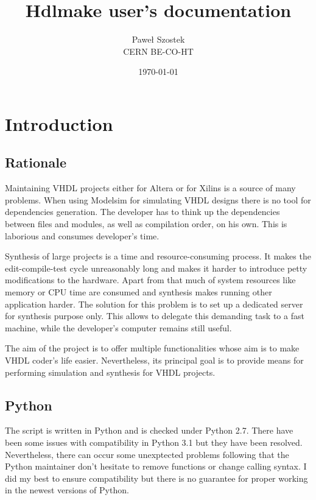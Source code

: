 \documentclass[a4paper,11pt]{article}
\title{Hdlmake user's documentation}
\author{Paweł Szostek \\ CERN BE-CO-HT}
\date{\today}
\begin{document}
\maketitle
\section*{Introduction}
\subsection*{Rationale}
Maintaining VHDL projects either for Altera or for Xilins is a source of many problems. When using Modelsim for simulating VHDL designs there is no tool for dependencies generation. The developer has to think up the dependencies between files and modules, as well as compilation order, on his own. This is laborious and consumes developer's time.

Synthesis of large projects is a time and resource-consuming process. It makes the edit-compile-test cycle unreasonably long and makes it harder to introduce petty modifications to the hardware. Apart from that much of system resources like memory or CPU time are consumed and synthesis makes running other application harder. The solution for this problem is to set up a dedicated server for synthesis purpose only. This allows to delegate this demanding task to a fast machine, while the developer's computer remains still useful.

The aim of the project is to offer multiple functionalities whose aim is to make VHDL coder's life easier. Nevertheless, its principal goal is to provide means for performing simulation and synthesis for VHDL projects.


\subsection*{Python}
The script is written in Python and is checked under Python 2.7. There have been some issues with compatibility in Python 3.1 but they have been resolved. Nevertheless, there can occur some unexptected problems following that the Python maintainer don't hesitate to remove functions or change calling syntax. I did my best to ensure compatibility but there is no guarantee for proper working in the newest versions of Python.
\end{document}
